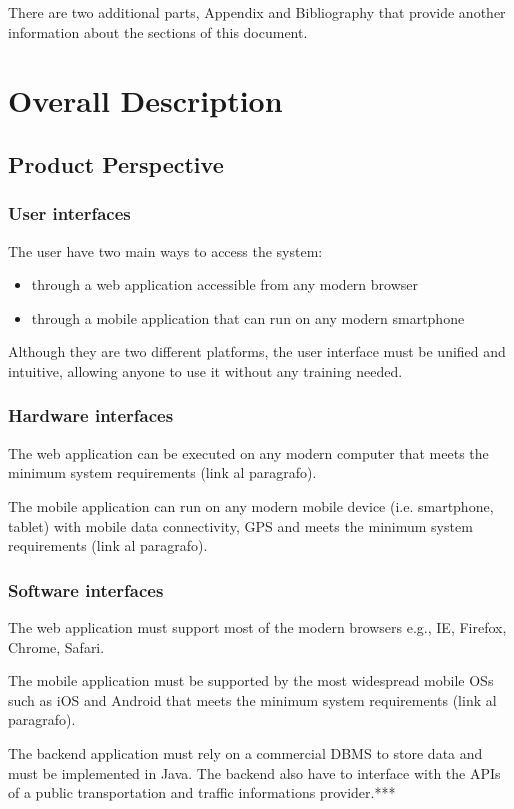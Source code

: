 \documentclass{article}
\begin{document}
	\bigskip
	There are two additional parts, Appendix and Bibliography that provide another information about the sections of this document.
	
	\section{Overall Description}	
	
	
	\subsection{Product Perspective}
	
	
	\subsubsection{User interfaces}
	The user have two main ways to access the system:
	\begin{itemize}
		\item through a web application accessible from any modern browser
		\item through a mobile application that can run on any modern smartphone
	\end{itemize}
	Although they are two different platforms, the user interface must be unified and intuitive, allowing anyone to use it without any training needed.


	\subsubsection{Hardware interfaces}
	The web application can be executed on any modern computer that meets the minimum system requirements (link al paragrafo).
	
	\bigskip
	The mobile application can run on any modern mobile device (i.e. smartphone, tablet) with mobile data connectivity,  GPS and meets the minimum system requirements (link al paragrafo).


	\subsubsection{Software interfaces}
	The web application must support most of the modern browsers e.g., IE, Firefox, Chrome, Safari.
	
	\bigskip
	The mobile application must be supported by the most widespread mobile OSs such as iOS and Android that meets the minimum system requirements (link al paragrafo).

	\bigskip
	The backend application must rely on a commercial DBMS to store data and must be implemented in Java.
	The backend also have to interface with the APIs of a public transportation and  traffic informations provider.***
	
\end{document}
